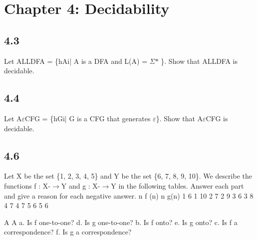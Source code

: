 \section*{Chapter 4: Decidability}

\subsection*{4.3}

Let ALLDFA = \{hAi| A is a DFA and L(A) = $\Sigma$$\ast$ \}. Show that ALLDFA is decidable.


\subsection*{4.4}

Let A$\varepsilon$CFG = \{hGi| G is a CFG that generates $\varepsilon$\}. Show that A$\varepsilon$CFG is decidable.


\subsection*{4.6}
\begingroup
\small
\ttfamily
\obeylines
\obeyspaces
Let X be the set \{1, 2, 3, 4, 5\} and Y be the set \{6, 7, 8, 9, 10\}. We describe the
                      functions f : X-$\to$Y and g : X-$\to$Y in the following tables. Answer each part
                      and give a reason for each negative answer.
                                                                n        f (n)                                             n        g(n)
                                                                1          6                                               1         10
                                                                2          7                                               2         9
                                                                3          6                                               3         8
                                                                4          7                                               4         7
                                                                5          6                                               5         6

                            A                                                                             A
                              a. Is f one-to-one?                                                             d. Is g one-to-one?
                              b. Is f onto?                                                                   e. Is g onto?
                              c. Is f a correspondence?                                                       f. Is g a correspondence?
\endgroup

